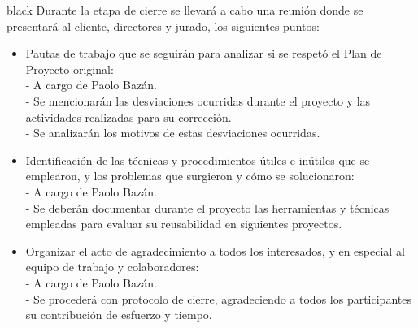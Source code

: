\documentclass[
11pt, %
codirector, %
]{charter}
\begin{document}
\begin{consigna}{black}
Durante la etapa de cierre se llevará a cabo una reunión donde se presentará al cliente, directores y jurado, los siguientes puntos:

\begin{itemize}
	\item Pautas de trabajo que se seguirán para analizar si se respetó el Plan de Proyecto original: \\
	 - A cargo de Paolo Bazán.  \\
	 - Se mencionarán las desviaciones ocurridas durante el proyecto y las actividades realizadas para su corrección. \\
	 - Se analizarán los motivos de estas desviaciones ocurridas. \\
	\item Identificación de las técnicas y procedimientos útiles e inútiles que se emplearon, y los problemas que surgieron y cómo se solucionaron: \\
	 - A cargo de Paolo Bazán.  \\
	 - Se deberán documentar durante el proyecto las herramientas y técnicas empleadas para evaluar su reusabilidad en siguientes proyectos. \\
	\item Organizar el acto de agradecimiento a todos los interesados, y en especial al equipo de trabajo y colaboradores: \\
	 - A cargo de Paolo Bazán. \\
	 - Se procederá con protocolo de cierre, agradeciendo a todos los participantes su contribución de esfuerzo y tiempo. \\
\end{itemize}

\end{consigna}
\end{document}
